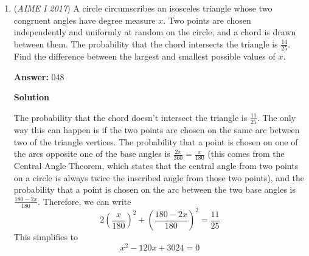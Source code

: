 \begin{enumerate}
 Observe that the coefficients of $c$, $y$, and $b$ are all divisible by $3$. By similar reasoning, $a$ must be divisible by $3$, so we let $a=3x$. Substituting and dividing by $3$, we get 
 \[1151x+6c+3y=2\cdot290b.\] We observe that this can no longer be reduced by similar means. 

 We know that $0<a,b,c<8\implies0<3x,b,4y<8$. We examine $0<4y<8$; this becomes $0<y<2$. It is apparent that $y=1\implies d=4$. However, the problem does not even ask for $d$, so it may appear that this find is meaningless. However, we substitute our value of $y$ in to get 
 \[1151x+6c+3=580b.\] 

 We know that $x$ is either $1$ or $2$, since $0<3x<8$. We take our equation modulo $6$ to find 
 \[5x+3\equiv4b\pmod{6}\implies3\equiv4b+x\pmod{6}.\] If $x=2$, then $1\equiv4b\pmod{6}$ - this is equivalent to saying that $1+6n=4b\implies 1=4b-6n$. However, $4b-6n$ is always even, and $1$ is odd. Thus, this case is not possible, so $x=1\implies a=3$. We know that $x=1$; thus, $3\equiv4b+1\pmod{6}\implies2\equiv4b\pmod{6}\implies1\equiv2b\pmod{3}$. Obviously, $b=2$ and $b=5$ work; however, if $b=5$, then the RHS of our original equation ($2\cdot290b$) is much too large to be equal to the LHS (the maximum possible value of the LHS is $1151\cdot1+6\cdot7+3\cdot1$, which is less than $1200$ while the RHS would become $2\cdot290\cdot5=2900$), so we have $b=2$. 

 We recall our equation of $1151x+6c+3=580b$. Plugging in what we know, we have $1151\cdot1+6c+3=580\cdot2\implies6c=6\implies c=1$. 

 Therefore, $\overline{abc}=\boxed{321}$. 

 by Technodoggo

 


	\item (\textit{AIME I 2017}) A circle circumscribes an isosceles triangle whose two congruent angles have degree measure $x$. Two points are chosen independently and uniformly at random on the circle, and a chord is drawn between them. The probability that the chord intersects the triangle is $\frac{14}{25}$. Find the difference between the largest and smallest possible values of $x$.


 
 \textbf{Answer: }048



\textbf{Solution}

The probability that the chord doesn't intersect the triangle is $\frac{11}{25}$. The only way this can happen is if the two points are chosen on the same arc between two of the triangle vertices. The probability that a point is chosen on one of the arcs opposite one of the base angles is $\frac{2x}{360}=\frac{x}{180}$ (this comes from the Central Angle Theorem, which states that the central angle from two points on a circle is always twice the inscribed angle from those two points), and the probability that a point is chosen on the arc between the two base angles is $\frac{180-2x}{180}$. Therefore, we can write 
 \[2\left(\frac{x}{180}\right)^2+\left(\frac{180-2x}{180}\right)^2=\frac{11}{25}\]This simplifies to 
 \[x^2-120x+3024=0\]


\end{enumerate}
